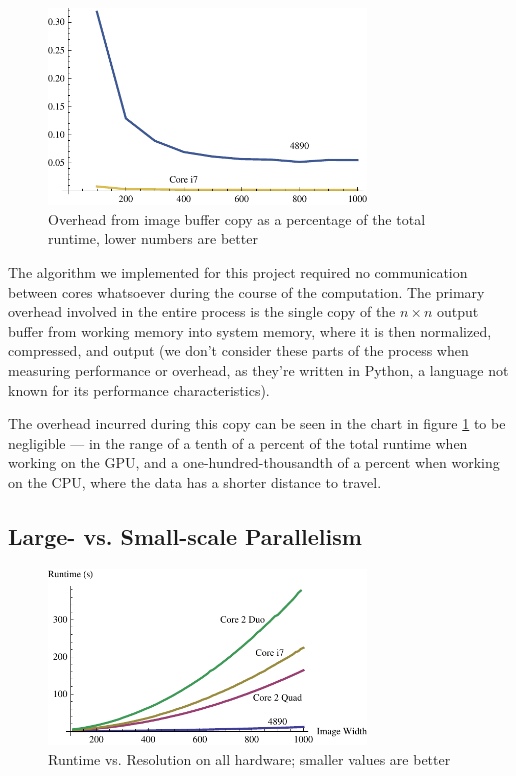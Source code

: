 \documentclass{acmsiggraph}
\begin{document}
\begin{figure}
    \includegraphics[width=84.5mm]{overheadPlot.pdf}
    \caption{Overhead from image buffer copy as a percentage of the total runtime, lower numbers are better}
    \label{fig:overheadPlot}
\end{figure}

The algorithm we implemented for this project required no communication between  cores whatsoever during the course of the computation. The primary overhead involved in the entire process is the single copy of the $n\times n$ output buffer from working memory into system memory, where it is then normalized, compressed, and output (we don't consider these parts of the process when measuring performance or overhead, as they're written in Python, a language not known for its performance characteristics).

The overhead incurred during this copy can be seen in the chart in figure \ref{fig:overheadPlot} to be negligible --- in the range of a tenth of a percent of the total runtime when working on the GPU, and a one-hundred-thousandth of a percent when working on the CPU, where the data has a shorter distance to travel.

\subsection{Large- vs. Small-scale Parallelism}

\begin{figure}
    \includegraphics[width=84.5mm]{runtimePlot.pdf}
    \caption{Runtime vs. Resolution on all hardware; smaller values are better}
    \label{fig:runtimePlot}
\end{figure}
\end{document}
